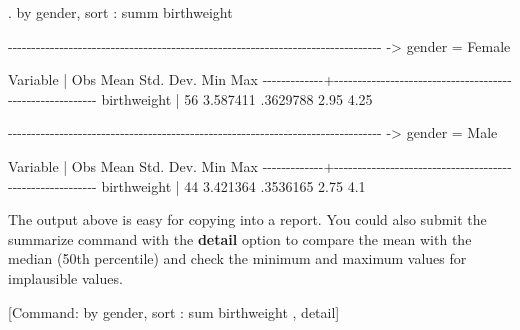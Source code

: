 \documentclass[
]{memoir}
\newenvironment{Shaded}{\begin{snugshade}}{\end{snugshade}}
\newcommand{\NormalTok}[1]{#1}
\begin{document}
\begin{Shaded}
\begin{Highlighting}[]
\NormalTok{. by gender, sort : summ birthweight}

\NormalTok{{-}{-}{-}{-}{-}{-}{-}{-}{-}{-}{-}{-}{-}{-}{-}{-}{-}{-}{-}{-}{-}{-}{-}{-}{-}{-}{-}{-}{-}{-}{-}{-}{-}{-}{-}{-}{-}{-}{-}{-}{-}{-}{-}{-}{-}{-}{-}{-}{-}{-}{-}{-}{-}{-}{-}{-}{-}{-}{-}{-}{-}{-}{-}{-}{-}{-}{-}{-}{-}{-}{-}{-}{-}{-}{-}{-}{-}{-}{-}{-}}
\NormalTok{{-}\textgreater{} gender = Female}

\NormalTok{    Variable |        Obs        Mean    Std. Dev.       Min        Max}
\NormalTok{{-}{-}{-}{-}{-}{-}{-}{-}{-}{-}{-}{-}{-}+{-}{-}{-}{-}{-}{-}{-}{-}{-}{-}{-}{-}{-}{-}{-}{-}{-}{-}{-}{-}{-}{-}{-}{-}{-}{-}{-}{-}{-}{-}{-}{-}{-}{-}{-}{-}{-}{-}{-}{-}{-}{-}{-}{-}{-}{-}{-}{-}{-}{-}{-}{-}{-}{-}{-}{-}{-}}
\NormalTok{ birthweight |         56    3.587411    .3629788       2.95       4.25}

\NormalTok{{-}{-}{-}{-}{-}{-}{-}{-}{-}{-}{-}{-}{-}{-}{-}{-}{-}{-}{-}{-}{-}{-}{-}{-}{-}{-}{-}{-}{-}{-}{-}{-}{-}{-}{-}{-}{-}{-}{-}{-}{-}{-}{-}{-}{-}{-}{-}{-}{-}{-}{-}{-}{-}{-}{-}{-}{-}{-}{-}{-}{-}{-}{-}{-}{-}{-}{-}{-}{-}{-}{-}{-}{-}{-}{-}{-}{-}{-}{-}{-}}
\NormalTok{{-}\textgreater{} gender = Male}

\NormalTok{    Variable |        Obs        Mean    Std. Dev.       Min        Max}
\NormalTok{{-}{-}{-}{-}{-}{-}{-}{-}{-}{-}{-}{-}{-}+{-}{-}{-}{-}{-}{-}{-}{-}{-}{-}{-}{-}{-}{-}{-}{-}{-}{-}{-}{-}{-}{-}{-}{-}{-}{-}{-}{-}{-}{-}{-}{-}{-}{-}{-}{-}{-}{-}{-}{-}{-}{-}{-}{-}{-}{-}{-}{-}{-}{-}{-}{-}{-}{-}{-}{-}{-}}
\NormalTok{ birthweight |         44    3.421364    .3536165       2.75        4.1}
\end{Highlighting}
\end{Shaded}

The output above is easy for copying into a report. You could also submit the summarize command with the \textbf{detail} option to compare the mean with the median (50th percentile) and check the minimum and maximum values for implausible values.

{[}Command: by gender, sort : sum birthweight , detail{]}
\end{document}

